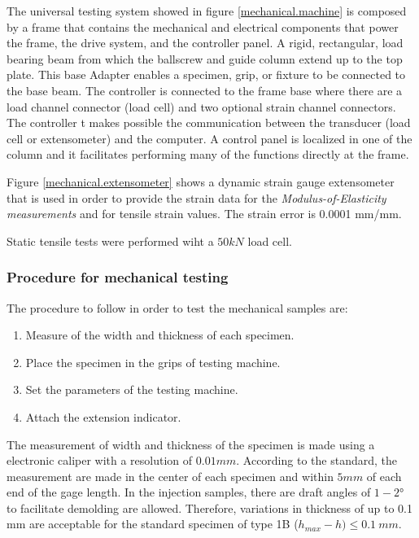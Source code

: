 \begin{enumerate}[leftmargin=0in, label=\emph{\alph*}.]
	
	The universal testing system showed in figure \ref{mechanical.machine} is composed by a frame that contains the mechanical and electrical components that power the frame, the drive system, and the controller panel.
	A rigid, rectangular, load bearing beam from which the ballscrew and guide column extend up to the top plate. 
	This base Adapter enables a specimen, grip, or fixture to be connected to the base beam.
	The controller is connected to the frame base where there are a load channel connector (load cell) and two optional strain channel connectors. 
	The controller t makes possible the communication between the transducer (load cell or extensometer) and the computer.
	A control panel is localized in one of the column and it facilitates performing many of the functions directly at the frame.
	
	Figure \ref{mechanical.extensometer} shows a dynamic strain gauge extensometer that is used in order to provide the strain data for the \emph{Modulus-of-Elasticity measurements} and for tensile strain values. The strain error is 0.0001 mm/mm.
	

Static tensile tests were performed wiht a $50 kN$ load cell. 
	
	
	

\subsubsection{Procedure for mechanical testing}	

The procedure to follow in order to test the mechanical samples are:	

\begin{enumerate}[noitemsep]
	\item Measure of the width and thickness of each specimen.
	\item Place the specimen in the grips of testing machine.
	\item Set the parameters of the testing machine.
	\item Attach the extension indicator.

\end{enumerate}



The measurement of width and thickness of the specimen is made using a electronic caliper with a resolution of $0.01mm$.
According to the standard, the measurement are made in the center of each specimen and within $5 mm$ of each end of the gage length. In the injection samples, there are draft angles of $1 - 2°$ to facilitate demolding are allowed. Therefore, variations in thickness of up to 0.1 mm are acceptable for the standard specimen of type  1B  ($h_{max}-h) \leq 0.1~mm$. 


\end{enumerate}
